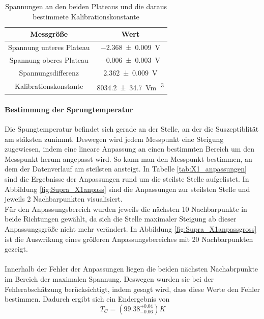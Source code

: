 \documentclass[12pt,a4paper]{article}
\begin{document}
\begin{table}
\centering
\begin{tabular}{|c|c|}
\hline 
Messgröße & Wert \\ 
\hline 
Spannung unteres Plateau & \SI{-2.368\pm 0.009}{V} \\ 
\hline 
Spannung oberes Plateau & \SI{-0.006\pm 0.003}{V} \\ 
\hline 
Spannungsdifferenz & \SI{2.362\pm 0.009}{V} \\ 
\hline 
Kalibrationskonstante & \SI{8034.2\pm 34.7}{Vm^{-3}} \\ 
\hline 
\end{tabular} 
\caption{Spannungen an den beiden Plateaus und die daraus bestimmete Kalibrationskonstante}
\label{tab:X1_const}
\end{table}

\paragraph{Bestimmung der Sprungtemperatur}
Die Spungtemperatur befindet sich gerade an der Stelle, an der die Suszeptiblität am stäksten zunimmt. Deswegen wird jedem Messpunkt eine Steigung zugewiesen, indem eine lineare Anpassung an einen bestimmten Bereich um den Messpunkt herum angepasst wird. So kann man den Messpunkt bestimmen, an dem der Datenverlauf am steilsten ansteigt. In Tabelle \ref{tab:X1_anpassungen} sind die Ergebnisse der Anpassungen rund um die steilste Stelle aufgelistet. In Abbildung
\ref{fig:Supra_X1anpass} sind die Anpassungen zur steilsten Stelle und jeweils 2 Nachbarpunkten visualisiert.\\
Für den Anpassungsbereich wurden jeweils die nächsten 10 Nachbarpunkte in beide Richtungen gewählt, da sich die Stelle maximaler Steigung ab dieser Anpassungsgröße nicht mehr verändert. In Abbildung \ref{fig:Supra_X1anpassgross} ist die Auswrikung eines größeren Anpassungsbereiches mit 20 Nachbarpunkten gezeigt.\\
\\
Innerhalb der Fehler der Anpassungen liegen die beiden nächsten Nachabrpunkte im Bereich der maximalen Spannung. Deswegen wurden sie bei der Fehlerabschätzung berücksichtigt, indem gesagt wird, dass diese Werte den Fehler bestimmen. Dadurch ergibt sich ein Endergebnis von
\begin{equation*}
T_C = (99.38^{+0.04}_{-0.06}) K
\end{equation*}
\end{document}

